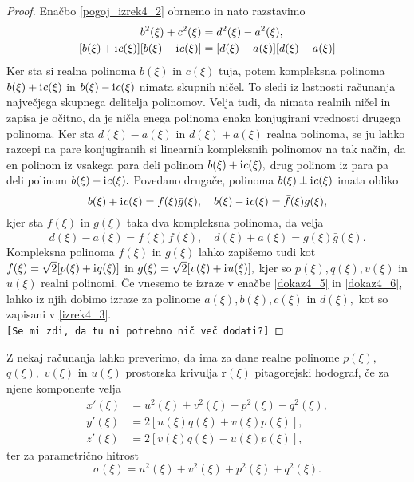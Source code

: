 \documentclass[12pt,a4paper,twoside]{article}
\newcommand{\iu}{\mathrm{i}\mkern1mu} %
\theoremstyle{definition} %
\theoremstyle{plain} %
\numberwithin{equation}{section}  %
\begin{document}
\begin{proof}
	Enačbo \eqref{pogoj_izrek4_2} obrnemo in nato razstavimo
	\begin{align}
		b^2(\xi)+c^2(\xi)&=d^2(\xi)-a^2(\xi), \nonumber \\
		[b(\xi)+\iu c(\xi)][b(\xi)-\iu c(\xi)]&=[d(\xi)-a(\xi)][d(\xi)+a(\xi)] \label{dokaz4_4}
	\end{align}
	Ker sta si realna polinoma $b(\xi)$ in $c(\xi)$ tuja, potem kompleksna polinoma $b(\xi)+\iu c(\xi)$ in $b(\xi)-\iu c(\xi)$ nimata skupnih ničel. To sledi iz lastnosti računanja največjega skupnega delitelja polinomov. Velja tudi, da nimata realnih ničel in zapisa je očitno, da je ničla enega polinoma enaka konjugirani vrednosti drugega polinoma. Ker sta $d(\xi)-a(\xi)$ in $d(\xi)+a(\xi)$ realna polinoma, se ju lahko razcepi na pare konjugiranih si linearnih kompleksnih polinomov na tak način, da en polinom iz vsakega para deli polinom $b(\xi)+\iu c(\xi),$ drug polinom iz para pa deli polinom $b(\xi)-\iu c(\xi).$ Povedano drugače, polinoma $b(\xi) \pm \iu c(\xi)$ imata obliko
	\begin{equation}
	\label{dokaz4_5}
		b(\xi)+ \iu c(\xi)=f(\xi)\bar{g}(\xi), \quad b(\xi)-\iu c(\xi)=\bar{f}(\xi)g(\xi),
	\end{equation}
	kjer sta $f(\xi)$ in $g(\xi)$ taka dva kompleksna polinoma, da velja
	\begin{equation}
		\label{dokaz4_6}
		d(\xi)-a(\xi)=f(\xi)\bar{f}(\xi), \quad d(\xi)+a(\xi)=g(\xi)\bar{g}(\xi).
	\end{equation}
	Kompleksna polinoma $f(\xi)$ in $g(\xi)$ lahko zapišemo tudi kot $f(\xi)=\sqrt{2}[p(\xi)+\iu q(\xi)]$ in $g(\xi)=\sqrt{2}[v(\xi)+\iu u(\xi)],$ kjer so $p(\xi),q(\xi),v(\xi)$ in $u(\xi)$ realni polinomi. Če vnesemo te izraze v enačbe \eqref{dokaz4_5} in \eqref{dokaz4_6}, lahko iz njih dobimo izraze za polinome $a(\xi),b(\xi),c(\xi)$ in $d(\xi),$ kot so zapisani v \eqref{izrek4_3}.\\
\texttt{[Se mi zdi, da tu ni potrebno nič več dodati?]}
\end{proof}

Z nekaj računanja lahko preverimo, da ima za dane realne polinome $p(\xi),$ $q(\xi),$ $v(\xi)$ in $u(\xi)$ prostorska krivulja $\mathbf{r}(\xi)$ pitagorejski hodograf, če za njene komponente velja
\begin{align}
	x'(\xi)&=u^2(\xi)+v^2(\xi)-p^2(\xi)-q^2(\xi), \nonumber \\
	y'(\xi)&=2[u(\xi)q(\xi)+v(\xi)p(\xi)], \nonumber \\
	z'(\xi)&=2[v(\xi)q(\xi)-u(\xi)p(\xi)], \label{eq4_7}
\end{align}
ter za parametrično hitrost
\begin{equation}
	\label{eq4_8}
	\sigma(\xi)=u^2(\xi)+v^2(\xi)+p^2(\xi)+q^2(\xi).
\end{equation}
\end{document}
